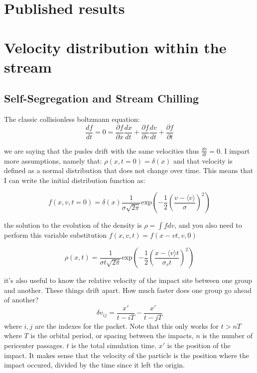 \section{Published results}

\section{Velocity distribution within the stream}

    \subsection{Self-Segregation and Stream Chilling}

    The classic collisionless boltzmann equation:
    \begin{equation}
        \frac{df}{dt} = 0 = \frac{\partial f}{\partial x} \frac{dx}{dt} + \frac{\partial f}{\partial v} \frac{dv}{dt}+ \frac{\partial f}{\partial t} 
    \end{equation}

    we are saying that the pusles drift with the same velocities thus $\frac{dv}{dt}=0$. I impart more assumptions, namely that: $\rho(x,t=0)=\delta(x)$ and that velocity is defined as a normal distribution that does not change over time. This means that I can write the initial distribution function as:
    
    \begin{equation}
        f(x,v,t=0) = \delta(x)\frac{1}{\sigma\sqrt{2\pi}}\textrm{exp}\left(-\frac{1}{2}\left(\frac{v-\langle v \rangle}{\sigma}\right)^2\right)
    \end{equation}    

    the solution to the evolution of the density is $\rho = \int f dv$, and you also need to perform this variable substitution $f(x,v,t) = f(x-vt,v,0)$

    \begin{equation}
        \rho(x,t) = \frac{1}{\sigma t \sqrt{2\pi} }\textrm{exp}\left(-\frac{1}{2}\left(\frac{x-\langle v \rangle t}{\sigma_v t}\right)^2\right)
    \end{equation}

    it's also useful to know the relative velocity of the impact site between one group and another. These things drift apart. How much faster does one group go ahead of another? 
    \begin{equation}
        \delta v_{ij} = \frac{x\prime}{t-iT} - \frac{x\prime}{t-jT}
    \end{equation}
    where $i,j$ are the indexes for the packet. Note that this only works for $t > nT$ where $T$ is the orbital period, or spacing between the impacts, $n$ is the number of pericenter passages. $t$ is the total simulation time. $x\prime$ is the position of the impact. It makes sense that the velocity of the particle is the position where the impact occured, divided by the time since it left the origin. 